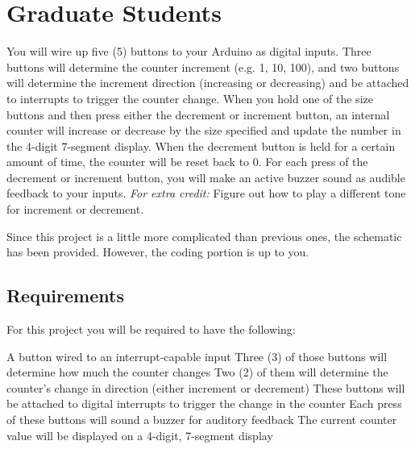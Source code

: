 \newpage
\section*{Graduate Students} 
You will wire up five (5) buttons to your Arduino as digital inputs.
Three buttons will determine the counter increment (e.g. 1, 10, 100), and two buttons will determine the increment direction (increasing or decreasing) and be attached to interrupts to trigger the counter change.
When you hold one of the size buttons and then press either the decrement or increment button, an internal counter will increase or decrease by the size specified and update the number in the 4-digit 7-segment display.
When the decrement button is held for a certain amount of time, the counter will be reset back to 0.
For each press of the decrement or increment button, you will make an active buzzer sound as audible feedback to your inputs. \emph{For extra credit:} Figure out how to play a different tone for increment or decrement.

Since this project is a little more complicated than previous ones, the schematic has been provided. However, the coding portion is up to you.

    \subsection*{Requirements}
    For this project you will be required to have the following:
    \begin{outline}
        \1 A button wired to an interrupt-capable input
            \2 Three (3) of those buttons will determine how much the counter changes
            \2 Two (2) of them will determine the counter's change in direction (either increment or decrement)
                \3 These buttons will be attached to digital interrupts to trigger the change in the counter
                \3 Each press of these buttons will sound a buzzer for auditory feedback
        \1 The current counter value will be displayed on a 4-digit, 7-segment display
    \end{outline}

    \newpage
